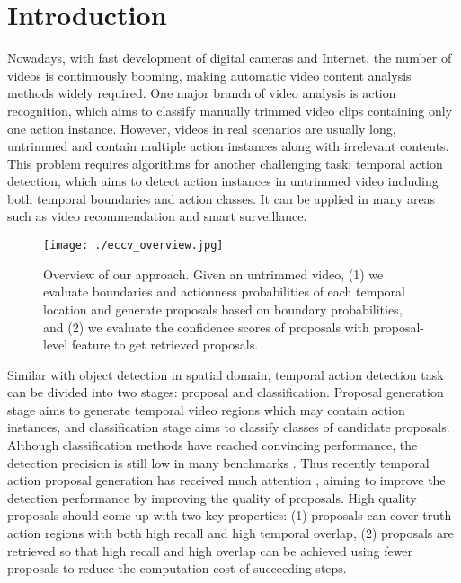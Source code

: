 \documentclass[runningheads]{llncs}
\begin{document}
\section{Introduction}


Nowadays, with fast development of  digital cameras and Internet, the number of videos is continuously booming,  making automatic  video content analysis methods widely required.
One major branch of video analysis is action recognition, which aims to classify manually trimmed video clips containing only one action instance.
However, videos in real scenarios are usually long, untrimmed and contain multiple action instances along with irrelevant contents. This problem requires algorithms for another challenging task: temporal action detection, which aims to detect action instances in untrimmed video including both temporal boundaries and action classes. It can be applied in many areas such as video recommendation and smart surveillance.

\begin{figure}[t]
\setlength{\abovecaptionskip}{-0.3cm} %
\setlength{\belowcaptionskip}{-0.5cm} %
\begin{center}
\begin{minipage}[b]{1.0\linewidth}
  \centering
  \centerline{\texttt{[image: ./eccv\_overview.jpg]}}
  \medskip
\end{minipage}
\end{center}
   \caption{Overview of our approach. Given an untrimmed video, (1) we evaluate boundaries and actionness probabilities of each temporal location and generate proposals based on boundary probabilities, and (2) we evaluate the confidence scores of proposals with proposal-level feature to get retrieved proposals.}
\label{fig_overview}
\end{figure}


Similar with object detection in spatial domain, temporal action detection task can be divided into two stages: proposal and classification. Proposal generation stage aims to generate temporal video regions which may contain action instances, and classification stage aims to classify classes of candidate proposals.
Although  classification methods  have reached convincing performance,  the detection precision is still low in many benchmarks \cite{caba2015activitynet,jiang2014thumos}.
Thus recently temporal action proposal generation has received much attention  \cite{sst_buch_cvpr17,fast_temporal_activity_cvpr16,escorcia2016daps,gao2017turn}, aiming to improve the detection performance by improving the quality of proposals.
High quality proposals should come up with two key properties: (1) proposals can cover truth action regions with both high recall and high temporal overlap, (2) proposals are retrieved so that high recall and high overlap can be achieved using fewer proposals to reduce the computation cost of succeeding steps.
\end{document}
